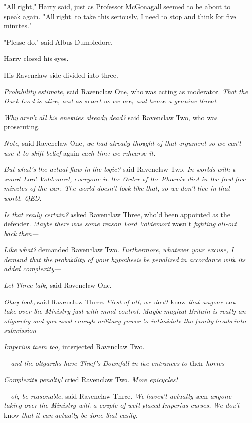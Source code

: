 "All right," Harry said, just as Professor McGonagall seemed to be about to
speak again. "All right, to take this seriously, I need to stop and think for
five minutes."

"Please do," said Albus Dumbledore.

Harry closed his eyes.

His Ravenclaw side divided into three.

\emph{Probability estimate,} said Ravenclaw One, who was acting as moderator.
\emph{That the Dark Lord is alive, and as smart as we are, and hence a genuine
threat.}

\emph{Why aren't all his enemies already dead?} said Ravenclaw Two, who was
prosecuting.

\emph{Note,} said Ravenclaw One, \emph{we had already thought of that argument
so we can't use it to shift belief} again \emph{each time we rehearse it.}

\emph{But what's the actual flaw in the logic?} said Ravenclaw Two. \emph{In
worlds with a smart Lord Voldemort, everyone in the Order of the Phoenix died
in the first five minutes of the war. The world doesn't look like that, so we
don't live in that world. QED.}

\emph{Is that really certain?} asked Ravenclaw Three, who'd been appointed as
the defender. \emph{Maybe there was some reason Lord Voldemort} wasn't
\emph{fighting all-out back then—}

\emph{Like what?} demanded Ravenclaw Two. \emph{Furthermore, whatever your
excuse, I demand that the probability of your hypothesis be penalized in
accordance with its added complexity—}

\emph{Let Three talk,} said Ravenclaw One.

\emph{Okay{\el} look,} said Ravenclaw Three. \emph{First of all, we don't}
know \emph{that anyone can take over the Ministry just with mind control. Maybe
magical Britain is really an oligarchy and you need enough military power to
intimidate the family heads into submission—}

\emph{Imperius them too,} interjected Ravenclaw Two.

\emph{—and the oligarchs have Thief's Downfall in the entrances to}
their \emph{homes—}

\emph{Complexity penalty!} cried Ravenclaw Two. \emph{More epicycles!}

—\emph{oh, be reasonable,} said Ravenclaw Three. \emph{We haven't actually}
seen \emph{anyone taking over the Ministry with a couple of well-placed
Imperius curses. We don't} know \emph{that it can actually be done that easily.}

